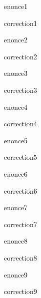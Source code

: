 \documentclass{classe-tex3R}
\begin{document}

\begin{enonce}
  enonce1
\end{enonce}

\begin{correction}
  correction1
\end{correction}

\begin{enonce}
  enonce2
\end{enonce}

\begin{correction}
  correction2
\end{correction}

\begin{enonce}
  enonce3
\end{enonce}

\begin{correction}
  correction3
\end{correction}

\begin{enonce}
  enonce4
\end{enonce}

\begin{correction}
  correction4
\end{correction}

\begin{enonce}
  enonce5
\end{enonce}

\begin{correction}
  correction5
\end{correction}

\begin{enonce}
  enonce6
\end{enonce}

\begin{correction}
  correction6
\end{correction}

\begin{enonce}
  enonce7
\end{enonce}

\begin{correction}
  correction7
\end{correction}

\begin{enonce}
  enonce8
\end{enonce}

\begin{correction}
  correction8
\end{correction}

\begin{enonce}
  enonce9
\end{enonce}

\begin{correction}
  correction9
\end{correction}
\end{document}
